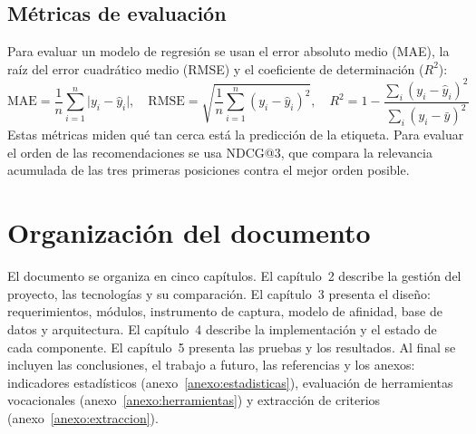\subsection{Métricas de evaluación}
Para evaluar un modelo de regresión se usan el error absoluto medio (MAE), la raíz del error cuadrático medio (RMSE) y el coeficiente de determinación ($R^2$):
\begin{equation}
\mathrm{MAE}=\frac{1}{n}\sum_{i=1}^{n}\lvert y_i-\hat{y}_i\rvert, \quad
\mathrm{RMSE}=\sqrt{\frac{1}{n}\sum_{i=1}^{n}(y_i-\hat{y}_i)^2}, \quad
R^2=1-\frac{\sum_i (y_i-\hat{y}_i)^2}{\sum_i (y_i-\bar{y})^2}
\end{equation}
Estas métricas miden qué tan cerca está la predicción de la etiqueta. Para evaluar el orden de las recomendaciones se usa NDCG@3, que compara la relevancia acumulada de las tres primeras posiciones contra el mejor orden posible.

\section{Organización del documento}
El documento se organiza en cinco capítulos. El capítulo~2 describe la gestión del proyecto, las tecnologías y su comparación. El capítulo~3 presenta el diseño: requerimientos, módulos, instrumento de captura, modelo de afinidad, base de datos y arquitectura. El capítulo~4 describe la implementación y el estado de cada componente. El capítulo~5 presenta las pruebas y los resultados. Al final se incluyen las conclusiones, el trabajo a futuro, las referencias y los anexos: indicadores estadísticos (anexo~\ref{anexo:estadisticas}), evaluación de herramientas vocacionales (anexo~\ref{anexo:herramientas}) y extracción de criterios (anexo~\ref{anexo:extraccion}).

\endinput
